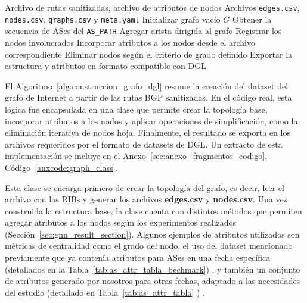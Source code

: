         

\begin{algorithm}[H]
\caption{Construcción del grafo de Internet en formato DGL}
\label{alg:construccion_grafo_dgl}
\begin{algorithmic}[1]
\Require Archivo de rutas sanitizadas, archivo de atributos de nodos
\Ensure Archivos \texttt{edges.csv}, \texttt{nodes.csv}, \texttt{graphs.csv} y \texttt{meta.yaml}
\State Inicializar grafo vacío $G$
    \State Obtener la secuencia de ASes del \texttt{AS\_PATH}
        \State Agregar arista dirigida al grafo
        \State Registrar los nodos involucrados
    \EndFor
\EndFor
\State Incorporar atributos a los nodos desde el archivo correspondiente
    \State Eliminar nodos según el criterio de grado definido
\EndIf
\State Exportar la estructura y atributos en formato compatible con DGL
\end{algorithmic}
\end{algorithm}
El Algoritmo~\ref{alg:construccion_grafo_dgl} resume la creación del dataset del grafo de Internet a partir de las rutas BGP sanitizadas. En el código real, esta lógica fue encapsulada en una clase que permite crear la topología base, incorporar atributos a los nodos y aplicar operaciones de simplificación, como la eliminación iterativa de nodos hoja. Finalmente, el resultado se exporta en los archivos requeridos por el formato de datasets de DGL. Un extracto de esta implementación se incluye en el Anexo~\ref{sec:anexo_fragmentos_codigo}, Código~\ref{anxcode:graph_class}.


Esta clase se encarga primero de crear la topología del grafo, es decir, leer el archivo con las RIBs y generar los archivos \textbf{edges.csv} y \textbf{nodes.csv}. Una vez construida la estructura base, la clase cuenta con distintos métodos que permiten agregar atributos a los nodos según los experimentos realizados (Sección~\ref{sec:gnn_result_section}). Algunos ejemplos de atributos utilizados son métricas de centralidad como el grado del nodo, el uso del dataset mencionado previamente que ya contenía atributos para ASes en una fecha específica (detallados en la Tabla~\ref{tab:as_attr_tabla_bechmark}) , y también un conjunto de atributos generado por nosotros para otras fechas, adaptado a las necesidades del estudio (detallado en Tabla~\ref{tab:as_attr_tabla} ) .\\
 
